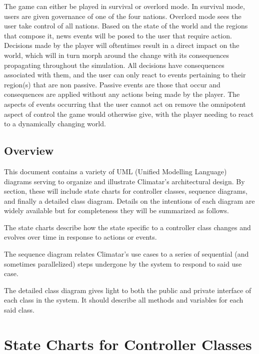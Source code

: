\documentclass[]{article}
\begin{document}
\vspace{5mm}
\noindent
The game can either be played in survival or overlord mode. In
survival mode, users are given governance of one of the four nations.
Overlord mode sees the user take control of all nations. Based
on the state of the world and the regions that compose it, news events
will be posed to the user that require action. Decisions made by the
player will oftentimes result in a direct impact on the world, which
will in turn morph around the change with its consequences propagating
throughout the simulation. All decisions have consequences associated
with them, and the user can only react to events pertaining to their
region(s) that are non passive. Passive events are those that occur
and consequences are applied without any actions being made by the
player. The aspects of events occurring that the user cannot act on
remove the omnipotent aspect of control the game would otherwise give,
with the player needing to react to a dynamically changing world.

\subsection{Overview}
\label{sub:overview}
This document contains a variety of UML (Unified Modelling Language)
diagrams serving to organize and illustrate Climatar's architectural
design. By section, these will include state charts for controller
classes, sequence diagrams, and finally a detailed class
diagram. Details on the intentions of each diagram are widely
available but for completeness they will be summarized as follows.

\vspace{5mm}
\noindent
The state charts describe how the state specific to a controller class
changes and evolves over time in response to actions or events.

\vspace{5mm}
\noindent
The sequence diagram relates Climatar's use cases to a series of sequential
(and sometimes parallelized) steps undergone by the system to respond to 
said use case.

\vspace{5mm}
\noindent
The detailed class diagram gives light to both the public and private
interface of each class in the system. It should describe all methods
and variables for each said class.


\section{State Charts for Controller Classes}
\label{sec:state_charts_for_controller_classes}
\end{document}
